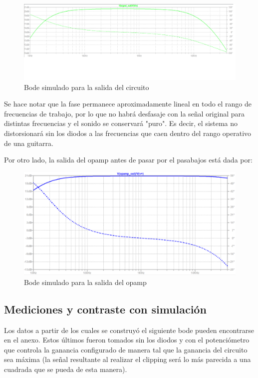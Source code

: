 \documentclass[../../main.tex]{subfiles}
\begin{document}
\begin{figure}[H]
	\includegraphics[scale=.4]{imagenes/Bode_simulacion.png}
	\caption{Bode simulado para la salida del circuito}
	\label{fig:ej5_Bode_simulacion}
\end{figure}
 
Se hace notar que la fase permanece aproximadamente lineal en todo el rango de frecuencias de trabajo, por lo que no habrá desfasaje con la señal original para distintas frecuencias y el sonido se conservará "puro". Es decir, el sistema no distorsionará sin los diodos a las frecuencias que caen dentro del rango operativo de una guitarra.\par

Por otro lado, la salida del opamp antes de pasar por el pasabajos está dada por:
\begin{figure}[H]
	\centering
	\includegraphics[scale=.4]{imagenes/bode_opamp_simulacion_300mv.png}
	\caption{Bode simulado para la salida del opamp}
	\label{fig:ej5_bode_opamp_simulacion_300mv}
\end{figure}

\subsection{Mediciones y contraste con simulación}

Los datos a partir de los cuales se construyó el siguiente bode pueden encontrarse en el anexo. Estos últimos fueron tomados sin los diodos y con el potenciómetro que controla la ganancia configurado de manera tal que la ganancia del circuito sea máxima (la señal resultante al realizar el clipping será lo más parecida a una cuadrada que se pueda de esta manera).
\end{document}
